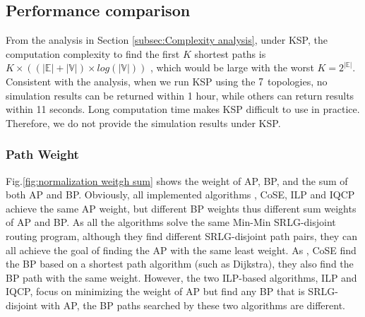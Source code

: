 



\subsection{Performance comparison}
From the analysis in Section \ref{subsec:Complexity analysis}, under KSP, the computation complexity to find the first $K$ shortest paths is $K\times ((|\mathbb{E}|+|\mathbb{V}|)\times log(|\mathbb{V}|))$ , which would be large with the worst $K=2^{|\mathbb{E}|}$.
 Consistent with the analysis, when we run KSP using the $7$ topologies, no simulation results can be returned within 1 hour, while others can return results within 11 seconds. Long computation time makes KSP difficult to use in practice. Therefore, we do not provide the simulation results under KSP.

\subsubsection{Path Weight}
Fig.\ref{fig:normalization weitgh sum} shows the weight of AP, BP, and the sum of both AP and BP. Obviously, all implemented algorithms \CI, CoSE, ILP and IQCP achieve the same AP weight, but different BP weights thus different sum weights of AP and BP. As all the algorithms solve the same Min-Min SRLG-disjoint routing program, although they find different SRLG-disjoint path pairs, they can all achieve the goal of finding the  AP with the same least weight.
As \CI, CoSE find the  BP based on a shortest path algorithm (such as Dijkstra), they also find the BP path with the same weight. However, the two ILP-based algorithms, ILP and IQCP, focus on minimizing the weight of AP but find any BP that is SRLG-disjoint with AP, the BP paths searched by these two algorithms are different.

